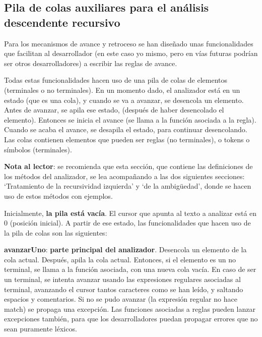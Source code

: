 \documentclass{report}
\begin{document}
	\subsection{Pila de colas auxiliares para el análisis descendente recursivo}
	
	Para los mecanismos de avance y retroceso se han diseñado unas funcionalidades que facilitan al desarrollador (en este caso yo mismo, pero en vías futuras podrían ser otros desarrolladores) a escribir las reglas de avance. 
	
	\vspace{10px}
	
	Todas estas funcionalidades hacen uso de una pila de colas de elementos (terminales o no terminales). En un momento dado, el analizador está en un estado (que es una cola), y cuando se va a avanzar, se desencola un elemento. Antes de avanzar, se apila ese estado, (después de haber desencolado el elemento). Entonces se inicia el avance (se llama a la función asociada a la regla). Cuando se acaba el avance, se desapila el estado, para continuar desencolando. Las colas contienen elementos que pueden ser reglas (no terminales), o tokens o símbolos (terminales).
	
	\vspace{10px}
	
	\textbf{Nota al lector}: se recomienda que esta sección, que contiene las definiciones de los métodos del analizador, se lea acompañando a las dos siguientes secciones: `Tratamiento de la recursividad izquierda' y `de la ambigüedad', donde se hacen uso de estos métodos con ejemplos. 
	
	\vspace{10px}
	
	Inicialmente, \textbf{la pila está vacía}. El cursor que apunta al texto a analizar está en 0 (posición inicial). A partir de ese estado, las funcionalidades que hacen uso de la pila de colas son las siguientes:
	
	\vspace{10px}
	\noindent
	\textbf{avanzarUno}: \textbf{parte principal del analizador}. Desencola un elemento de la cola actual. Después, apila la cola actual. Entonces, si el elemento es un no terminal, se llama a la función asociada, con una nueva cola vacía. En caso de ser un terminal, se intenta avanzar usando las expresiones regulares asociadas al terminal, avanzando el cursor tantos caracteres como se han leído, y saltando espacios y comentarios. Si no se pudo avanzar (la expresión regular no hace match) se propaga una excepción. Las funciones asociadas a reglas pueden lanzar excepciones también, para que los desarrolladores puedan propagar errores que no sean puramente léxicos.
	
\end{document}
